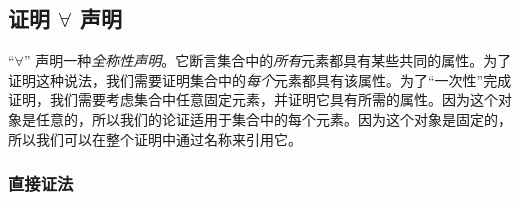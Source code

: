 \subsection{证明 $\forall$ 声明}\label{sec:section4.9.2}

``$\forall$'' 声明一种\emph{全称性声明}。它断言集合中的\emph{所有}元素都具有某些共同的属性。为了证明这种说法，我们需要证明集合中的\emph{每个}元素都具有该属性。为了``一次性''完成证明，我们需要考虑集合中任意固定元素，并证明它具有所需的属性。因为这个对象是任意的，所以我们的论证适用于集合中的每个元素。因为这个对象是固定的，所以我们可以在整个证明中通过名称来引用它。

\subsubsection*{直接证法}

\begin{center}
\noindent {}
\end{center}

\newpage

